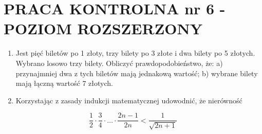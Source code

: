 \documentclass[10pt]{article}
\begin{document}
\section*{PRACA KONTROLNA nr 6 - POZIOM ROZSZERZONY}
\begin{enumerate}
  \item Jest pięć biletów po 1 złoty, trzy bilety po 3 złote i dwa bilety po 5 złotych. Wybrano losowo trzy bilety. Obliczyć prawdopodobieństwo, że: a) przynajmniej dwa z tych biletów mają jednakową wartość; b) wybrane bilety mają łączną wartość 7 złotych.
  \item Korzystając z zasady indukcji matematycznej udowodnić, że nierówność
\end{enumerate}

$$
\frac{1}{2} \cdot \frac{3}{4} \cdot \ldots \cdot \frac{2 n-1}{2 n}<\frac{1}{\sqrt{2 n+1}}
$$
\end{document}
